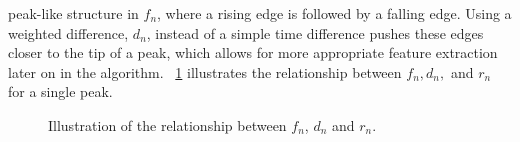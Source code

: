 \documentclass[conference]{IEEEtran}
\begin{document}
peak-like structure in $f_n$, where a rising edge is followed by a falling edge.
Using a weighted difference, $d_n$, instead of a simple time difference pushes these edges closer to the tip of a peak,
which allows for more appropriate feature extraction later on in the algorithm.
\figurename~\ref{fig:fwr} illustrates the relationship between $f_n, d_n, $ and $r_n$ for a single peak.
\begin{figure}
	\centering
	\caption{
	Illustration of the relationship between $f_n$, $d_n$ and $r_n$.}
	\label{fig:fwr}
\end{figure}
\end{document}
